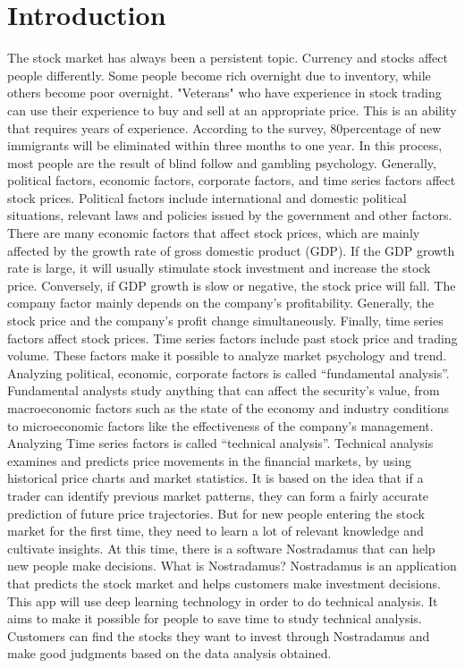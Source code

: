 \documentclass[conference]{IEEEtran}
\begin{document}
\section{Introduction}
The stock market has always been a persistent topic. Currency and stocks affect people differently. Some people become rich overnight due to inventory, while others become poor overnight. "Veterans" who have experience in stock trading can use their experience to buy and sell at an appropriate price. This is an ability that requires years of experience. According to the survey, 80percentage of new immigrants will be eliminated within three months to one year. In this process, most people are the result of blind follow and gambling psychology.
Generally, political factors, economic factors, corporate factors, and time series factors affect stock prices. Political factors include international and domestic political situations, relevant laws and policies issued by the government and other factors. There are many economic factors that affect stock prices, which are mainly affected by the growth rate of gross domestic product (GDP). If the GDP growth rate is large, it will usually stimulate stock investment and increase the stock price. Conversely, if GDP growth is slow or negative, the stock price will fall. The company factor mainly depends on the company's profitability. Generally, the stock price and the company's profit change simultaneously. Finally, time series factors affect stock prices. Time series factors include past stock price and trading volume. These factors make it possible to analyze market psychology and trend.
Analyzing political, economic, corporate factors is called “fundamental analysis”. Fundamental analysts study anything that can affect the security's value, from macroeconomic factors such as the state of the economy and industry conditions to microeconomic factors like the effectiveness of the company's management. Analyzing Time series factors is called “technical analysis”. Technical analysis examines and predicts price movements in the financial markets, by using historical price charts and market statistics. It is based on the idea that if a trader can identify previous market patterns, they can form a fairly accurate prediction of future price trajectories.
But for new people entering the stock market for the first time, they need to learn a lot of relevant knowledge and cultivate insights. At this time, there is a software Nostradamus that can help new people make decisions. What is Nostradamus? Nostradamus is an application that predicts the stock market and helps customers make investment decisions. This app will use deep learning technology in order to do technical analysis. It aims to make it possible for people to save time to study technical analysis. Customers can find the stocks they want to invest through Nostradamus and make good judgments based on the data analysis obtained.
\begin{comment}When a speaker reads the meaning and pronunciation of the word, a light on the speaker flicks up, showing the subtle nuance of the vocabulary via colored light.\end{comment} 
\end{document}
